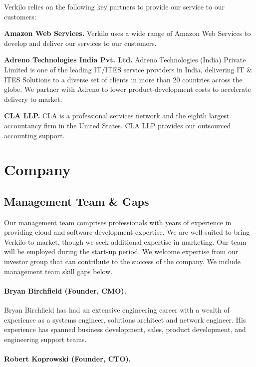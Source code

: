 \documentclass[10pt,openany]{book}
\begin{document}
Verkilo relies on the following key partners to provide our service to
our customers:

\textbf{Amazon Web Services.} Verkilo uses a wide range of Amazon Web
Services to develop and deliver our services to our customers.

\textbf{Adreno Technologies India Pvt. Ltd.} Adreno Technologies (India)
Private Limited is one of the leading IT/ITES service providers in
India, delivering IT \& ITES Solutions to a diverse set of clients in
more than 20 countries across the globe. We partner with Adreno to lower
product-development costs to accelerate delivery to market.

\textbf{CLA LLP.} CLA is a professional services network and the eighth
largest accountancy firm in the United States. CLA LLP provides our
outsourced accounting support.

\hypertarget{company}{%
\chapter{Company}\label{company}}

\hypertarget{management-team-gaps}{%
\section{Management Team \& Gaps}\label{management-team-gaps}}

Our management team comprises professionals with years of experience in
providing cloud and software-development expertise. We are well-suited
to bring Verkilo to market, though we seek additional expertise in
marketing. Our team will be employed during the start-up period. We
welcome expertise from our investor group that can contribute to the
success of the company. We include management team skill gaps below.

\hypertarget{bryan-birchfield-founder-cmo.}{%
\subsubsection{Bryan Birchfield (Founder,
CMO).}\label{bryan-birchfield-founder-cmo.}}

Bryan Birchfield has had an extensive engineering career with a wealth
of experience as a systems engineer, solutions architect and network
engineer. His experience has spanned business development, sales,
product development, and engineering support teams.

\hypertarget{robert-koprowski-founder-cto.}{%
\subsubsection{Robert Koprowski (Founder,
CTO).}\label{robert-koprowski-founder-cto.}}
\end{document}
